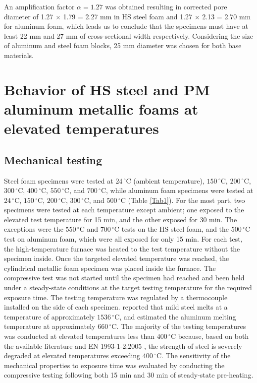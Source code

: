 \documentclass[review]{elsarticle}
\begin{document}
An amplification factor $\alpha=1.27$ was obtained resulting in corrected pore diameter of 1.27 $\times$ 1.79 = 2.27 mm in HS steel foam and 1.27 $\times$ 2.13 = 2.70 mm for aluminum foam, which leads us to conclude that the specimens must have at least 22 mm and 27 mm of cross-sectional width respectively. Considering the size of aluminum and steel foam blocks, 25 mm diameter was chosen for both base materials.


\section{Behavior of HS steel and PM aluminum metallic foams at elevated temperatures}

\subsection*{Mechanical testing}

Steel foam specimens were tested at $24\,^{\circ}\mathrm{C}$ (ambient temperature), $150\,^{\circ}\mathrm{C}$, $200\,^{\circ}\mathrm{C}$, $300\,^{\circ}\mathrm{C}$, $400\,^{\circ}\mathrm{C}$, $550\,^{\circ}\mathrm{C}$, and $700\,^{\circ}\mathrm{C}$, while aluminum foam specimens were tested at $24\,^{\circ}\mathrm{C}$, $150\,^{\circ}\mathrm{C}$, $200\,^{\circ}\mathrm{C}$, $300\,^{\circ}\mathrm{C}$, and $500\,^{\circ}\mathrm{C}$ (Table \ref{Tab1}). For the most part, two specimens were tested at each temperature except ambient; one exposed to the elevated test temperature for 15 min, and the other exposed for 30 min. The exceptions were the $550\,^{\circ}\mathrm{C}$ and $700\,^{\circ}\mathrm{C}$ tests on the HS steel foam, and the $500\,^{\circ}\mathrm{C}$ test on aluminum foam, which were all exposed for only 15 min. For each test, the high-temperature furnace was heated to the test temperature without the specimen inside. Once the targeted elevated temperature was reached, the cylindrical metallic foam specimen was placed inside the furnace. The compressive test was not started until the specimen had reached and been held under a steady-state conditions at the target testing temperature for the required exposure time. The testing temperature was regulated by a thermocouple installed on the side of each specimen. \cite{Avalloneetal2007} reported that mild steel melts at a temperature of approximately $1536\,^{\circ}\mathrm{C}$, and \cite{Ashsby2000} estimated the aluminum melting temperature at approximately $660\,^{\circ}\mathrm{C}$. The majority of the testing temperatures was conducted at elevated temperatures less than $400\,^{\circ}\mathrm{C}$  because, based on both the available literature and EN 1993-1-2:2005 \cite{EC3-1-2}, the strength of steel is severely degraded at elevated temperatures exceeding $400\,^{\circ}\mathrm{C}$. The sensitivity of the mechanical properties to exposure time was evaluated by conducting the compressive testing following both 15 min and 30 min of steady-state pre-heating.
\end{document}
